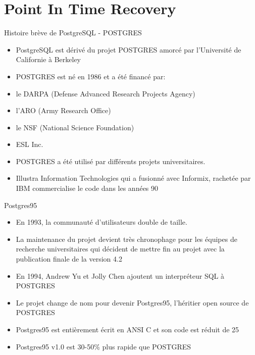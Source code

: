 \section{Point In Time Recovery}



\begin{frame}[fragile]{Histoire brève de PostgreSQL - POSTGRES}

   \begin{itemize}
      \item PostgreSQL est dérivé du projet POSTGRES amorcé par l'Université de Californie à Berkeley
      \item POSTGRES est né en 1986 et a été financé par:
      \item le DARPA (Defense Advanced Research Projects Agency)
      \item l'ARO (Army Research Office)
      \item le NSF (National Science Foundation)
      \item ESL Inc.
      \item POSTGRES a été utilisé par différents projets universitaires.
      \item Illustra Information Technologies qui a fusionné avec Informix, rachetée par IBM commercialise le code dans les années 90
   \end{itemize}

\begin{toile}
\end{toile}

\end{frame}


\begin{frame}[fragile]{Postgres95}

   \begin{itemize}
      \item En 1993, la communauté d'utilisateurs double de taille.
      \item La maintenance du projet devient très chronophage pour les équipes de recherche universitaires qui décident de mettre fin au projet avec la publication finale de la version 4.2
      \item En 1994, Andrew Yu et Jolly Chen ajoutent un interpréteur SQL à POSTGRES
      \item Le projet change de nom pour devenir Postgres95, l'héritier open source de POSTGRES
      \item Postgres95 est entièrement écrit en ANSI C et son code est réduit de 25%
      \item Postgres95 v1.0 est 30-50\% plus rapide que POSTGRES
   \end{itemize}

\end{frame}

